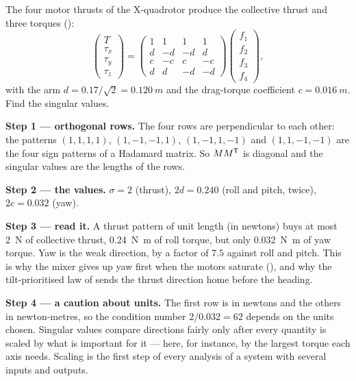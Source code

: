 \begin{example}
\label{ex:I-mixer}
The four motor thrusts of the X-quadrotor produce the collective thrust and three torques ():
\begin{equation*}
  \begin{pmatrix}T\\ \tau_x\\ \tau_y\\ \tau_z\end{pmatrix} =
  \begin{pmatrix}1 & 1 & 1 & 1\\ d & -d & -d & d\\ c & -c & c & -c\\ d & d & -d & -d\end{pmatrix}
  \begin{pmatrix}f_1\\ f_2\\ f_3\\ f_4\end{pmatrix},
\end{equation*}
with the arm $d = 0.17/\sqrt2 = \SI{0.120}{m}$ and the drag-torque coefficient $c = \SI{0.016}{m}$. Find the singular values.

\textbf{Step 1 — orthogonal rows.} The four rows are perpendicular to each other: the patterns $(1, 1, 1, 1)$, $(1, -1, -1, 1)$, $(1, -1, 1, -1)$ and $(1, 1, -1, -1)$ are the four sign patterns of a Hadamard matrix. So $MM^{\mathsf{T}}$ is diagonal and the singular values are the lengths of the rows.

\textbf{Step 2 — the values.} $\sigma = 2$ (thrust), $2d = 0.240$ (roll and pitch, twice), $2c = 0.032$ (yaw).

\textbf{Step 3 — read it.} A thrust pattern of unit length (in newtons) buys at most \SI{2}{N} of collective thrust, \SI{0.24}{N.m} of roll torque, but only \SI{0.032}{N.m} of yaw torque. Yaw is the weak direction, by a factor of $7.5$ against roll and pitch. This is why the mixer gives up yaw first when the motors saturate (), and why the tilt-prioritised law of  sends the thrust direction home before the heading.

\textbf{Step 4 — a caution about units.} The first row is in newtons and the others in newton-metres, so the condition number $2/0.032 = 62$ depends on the units chosen. Singular values compare directions fairly only after every quantity is scaled by what is important for it — here, for instance, by the largest torque each axis needs. Scaling is the first step of every analysis of a system with several inputs and outputs.
\end{example}

